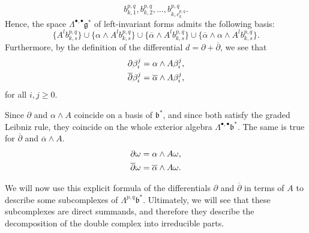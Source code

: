 \documentclass[leqno]{article}
\theoremstyle{definition}
\numberwithin{equation}{section}
\begin{document}
\[
b_{k, 1}^{p, q},
b_{k, 2}^{p, q},
\dots,
b_{k, c_k^{p, q}}^{p, q}.
\]
Hence, the space $\Lambda^{\bullet, \bullet} \mathfrak{g}^*$ of left-invariant forms admits the following basis:
\[
\{
A^lb_{k, s}^{p, q}
\}
\cup
\{
\alpha \wedge A^lb_{k, s}^{p, q}
\}
\cup
\{
\overline{\alpha} \wedge A^lb_{k, s}^{p, q}
\}
\cup
\{
\overline{\alpha} \wedge \alpha \wedge A^lb_{k, s}^{p, q}
\}.
\] 
Furthermore, by the definition of the differential $d = \partial + \overline{\partial}$, we see that
\[
\aligned
\partial \beta_i^j &= \alpha \wedge A\beta_i^j, \\
\overline{\partial} \beta_i^j &= \overline{\alpha} \wedge A\beta_i^j,
\endaligned
\]
for all $i, j \geqslant 0$.

Since $\partial$ and $\alpha \wedge A$ coincide on a basis of $\mathfrak{b}^*$, and since both satisfy the graded Leibniz rule, they coincide on the whole exterior algebra $\Lambda^{\bullet, \bullet}\mathfrak{b}^*$.
The same is true for $\overline{\partial}$ and $\overline{\alpha} \wedge A$.
\[
\aligned
\partial \omega &= \alpha \wedge A\omega, \\
\overline{\partial} \omega &= \overline{\alpha} \wedge A\omega.
\endaligned
\]

We will now use this explicit formula of the differentials $\partial$ and $\overline{\partial}$ in terms of $A$ to describe some subcomplexes of $\Lambda^{p, q} \mathfrak{b}^*$. Ultimately, we will see that these subcomplexes are direct summands, and therefore they describe the decomposition of the double complex into irreducible parts. 
\end{document}
